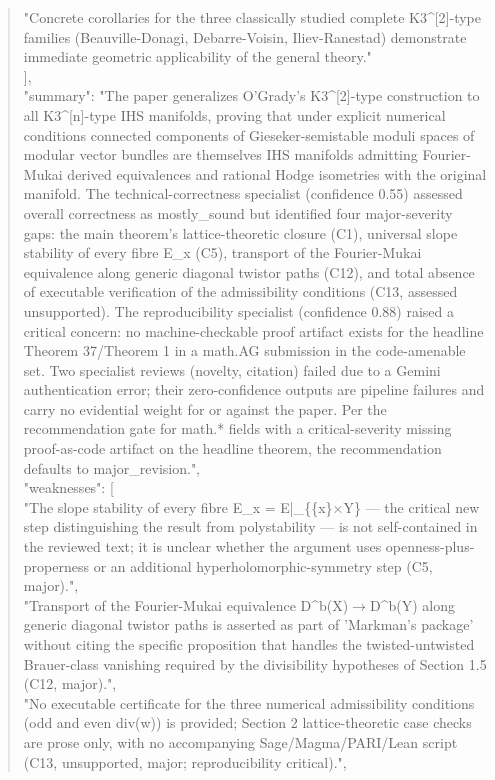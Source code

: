 \documentclass[11pt]{article}
\begin{document}
\begin{quote}
    "Concrete corollaries for the three classically studied complete K3\^{}[2]-type families (Beauville-Donagi, Debarre-Voisin, Iliev-Ranestad) demonstrate immediate geometric applicability of the general theory."\\
  ],\\
  "summary": "The paper generalizes O'Grady's K3\^{}[2]-type construction to all K3\^{}[n]-type IHS manifolds, proving that under explicit numerical conditions connected components of Gieseker-semistable moduli spaces of modular vector bundles are themselves IHS manifolds admitting Fourier-Mukai derived equivalences and rational Hodge isometries with the original manifold. The technical-correctness specialist (confidence 0.55) assessed overall correctness as mostly\_sound but identified four major-severity gaps: the main theorem's lattice-theoretic closure (C1), universal slope stability of every fibre E\_x (C5), transport of the Fourier-Mukai equivalence along generic diagonal twistor paths (C12), and total absence of executable verification of the admissibility conditions (C13, assessed unsupported). The reproducibility specialist (confidence 0.88) raised a critical concern: no machine-checkable proof artifact exists for the headline Theorem 37/Theorem 1 in a math.AG submission in the code-amenable set. Two specialist reviews (novelty, citation) failed due to a Gemini authentication error; their zero-confidence outputs are pipeline failures and carry no evidential weight for or against the paper. Per the recommendation gate for math.* fields with a critical-severity missing proof-as-code artifact on the headline theorem, the recommendation defaults to major\_revision.",\\
  "weaknesses": [\\
    "The slope stability of every fibre E\_x = E|\_\{\{x\}\ensuremath{\times}Y\} --- the critical new step distinguishing the result from polystability --- is not self-contained in the reviewed text; it is unclear whether the argument uses openness-plus-properness or an additional hyperholomorphic-symmetry step (C5, major).",\\
    "Transport of the Fourier-Mukai equivalence D\^{}b(X)\ensuremath{\to}D\^{}b(Y) along generic diagonal twistor paths is asserted as part of 'Markman's package' without citing the specific proposition that handles the twisted-untwisted Brauer-class vanishing required by the divisibility hypotheses of Section 1.5 (C12, major).",\\
    "No executable certificate for the three numerical admissibility conditions (odd and even div(w)) is provided; Section 2 lattice-theoretic case checks are prose only, with no accompanying Sage/Magma/PARI/Lean script (C13, unsupported, major; reproducibility critical).",\\

\end{quote}
\end{document}
